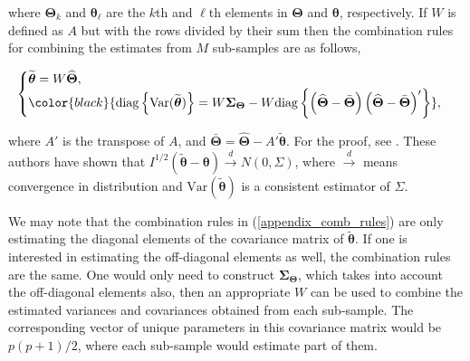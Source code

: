 \documentclass[11pt,a5paper,twoside]{book}
\begin{document}
where $\boldsymbol{\Theta}_{k}$ and $\boldsymbol{\theta}_{\ell}$ are the $k$th and $\ell$th elements in $\boldsymbol{\Theta}$ and $\boldsymbol{\theta}$, respectively. If $W$ is defined as $A$ but with the rows divided by their sum then the combination rules for combining the estimates from $M$ sub-samples are as follows,



\begin{equation}
\label{appendix_comb_rules}
\begin{cases}
\widetilde{\boldsymbol{\theta}} = W \widehat{\boldsymbol{\Theta}},\\
{\color{black}{\mathrm{diag}\left\{\mathrm{Var}(\widetilde{\boldsymbol{\theta}} )\right\}=  W \boldsymbol{\Sigma}_{\boldsymbol{\Theta}} - W \mathrm{diag}\left\{\left(\widehat{\boldsymbol{\Theta}}-\bar{\boldsymbol{\Theta}} \right) \left(\widehat{\boldsymbol{\Theta}}-\bar{\boldsymbol{\Theta}} \right)' \right\}}},
\end{cases}
\end{equation}

where $A'$ is the transpose of $A$, and $\bar{\boldsymbol{\Theta}} = \widehat{\boldsymbol{\Theta}} - A' \tilde{\boldsymbol{\theta}}$. For the proof, see \citet[][Appendix 2]{hoffman2001}. These authors have shown that $I^{1/2} ( \widetilde{\boldsymbol{\theta}} - \boldsymbol{\theta}) \xrightarrow{d} N(0, \Sigma)$, where $\xrightarrow{d}$ means convergence in distribution and $\mathrm{Var}(\widetilde{\boldsymbol{\theta}} )$ is a consistent estimator of $\Sigma$.

We may note that the combination rules in (\ref{appendix_comb_rules}) are only estimating the diagonal elements of the covariance matrix of $\widetilde{\boldsymbol{\theta}}$.  If one is interested in estimating the off-diagonal elements as well, the combination rules are the same. One would only need to construct $\boldsymbol{\Sigma}_{\boldsymbol{\Theta}}$, which takes into account the off-diagonal elements also, then an appropriate $W$ can be used to combine the estimated variances and covariances obtained from each sub-sample. The corresponding vector of unique parameters in this covariance matrix would be $p(p+1)/2$, where each sub-sample would estimate part of them. 
\end{document}
